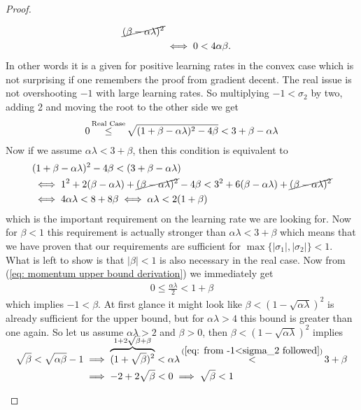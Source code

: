 \begin{proof}
\begin{description}[wide, labelindent=0pt]
\begin{align*}
			\cancel{(\beta-\alpha\lambda)^2}\\
			&\iff 0 < 4\alpha\beta.
		\end{align*}
		In other words it is a given for positive learning rates in the convex	
		case which is not surprising if one remembers the proof from gradient
		decent. The real issue is not overshooting \(-1\) with large learning
		rates. So multiplying \(-1<\sigma_2\) by two, adding 2 and moving the
		root to the other side we get
		\begin{align}\label{eq: from -1<sigma_2 followed}
			0 \xle{\text{Real Case}} \sqrt{(1+\beta-\alpha\lambda)^2 - 4\beta}
			< 3+\beta-\alpha\lambda
		\end{align}
		Now if we assume \(\alpha\lambda < 3+\beta\), then this condition is
		equivalent to 
		\begin{align}
			\nonumber
			&(1+\beta-\alpha\lambda)^2 - 4\beta < (3+\beta-\alpha\lambda)\\
			\nonumber
			&\iff 1^2 + 2(\beta-\alpha\lambda) + \cancel{(\beta-\alpha\lambda)^2} - 4\beta
			< 3^2 + 6(\beta-\alpha\lambda) + \cancel{(\beta-\alpha\lambda)^2}\\
			\label{eq: momentum upper bound derivation}
			&\iff 4\alpha\lambda < 8 + 8\beta
			\iff \alpha\lambda < 2(1+\beta)
		\end{align}
		which is the important requirement on the learning rate we are looking for.
		Now for \(\beta<1\) this requirement is actually stronger than
		\(\alpha\lambda <3+\beta\) which means that we have proven that our
		requirements are sufficient for \(\max\{|\sigma_1|,|\sigma_2|\}<1\).
		What is left to show is that \(|\beta|<1\) is also necessary in the real
		case. Now from (\ref{eq: momentum upper bound derivation}) we immediately
		get
		\begin{align*}
			0 \le \tfrac{\alpha\lambda}2 < 1+\beta
		\end{align*}
		which implies \(-1 < \beta\). At first glance it might look like
		\(\beta<(1-\sqrt{\alpha\lambda})^2\) is already sufficient for the upper
		bound, but for \(\alpha\lambda>4\) this bound is greater than one again.
		So let us assume \(\alpha\lambda>2\) and \(\beta>0\), then
		\(\beta<(1-\sqrt{\alpha\lambda})^2\) implies
		\begin{align*}
			\sqrt{\beta} < \sqrt{\alpha\beta} -1
			&\implies \smash{\overbrace{(1+\sqrt{\beta})^2}^{1+2\sqrt{\beta} + \beta}}
			< \alpha\lambda
			\stackrel{(\ref{eq: from -1<sigma_2 followed})}{<} 3+\beta \\
			&\implies -2 +2\sqrt{\beta} < 0
			\implies \sqrt{\beta} < 1
			\qedhere
		\end{align*}
 \end{description}
\end{proof}


\endinput